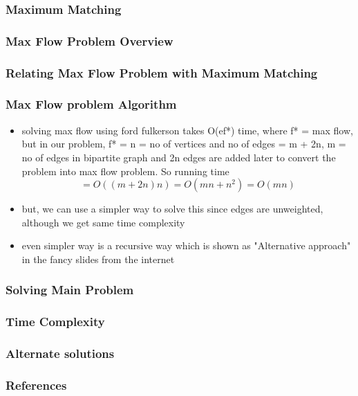 \documentclass[10pt]{beamer}
\begin{document}
\begin{frame}
	\frametitle{Maximum Matching}
\end{frame}

\begin{frame}
	\frametitle{Max Flow Problem Overview}
\end{frame}

\begin{frame}
	\frametitle{Relating Max Flow Problem with Maximum Matching}
\end{frame}


\begin{frame}
	\frametitle{Max Flow problem Algorithm}
	\begin{itemize}
		\item solving max flow using ford fulkerson takes O(ef*) time, where f* = max flow, but in our problem, f* = n = no of vertices
		and no of edges = m + 2n, m = no of edges in bipartite graph and 2n edges are added later to convert the problem into max flow problem. So running time$$ = O((m + 2n)n) = O(mn + n^2) = O(mn) $$
		
		
		\item but, we can use a simpler way to solve this since edges are unweighted, although we get same time complexity
		
		\item even simpler way is a recursive way which is shown as "Alternative approach" in the fancy slides from the internet

	\end{itemize}
	
		
\end{frame}



\begin{frame}
	\frametitle{Solving Main Problem}
\end{frame}

\begin{frame}
	\frametitle{Time Complexity}
\end{frame}

\begin{frame}
	\frametitle{Alternate solutions}
\end{frame}

\begin{frame}
	\frametitle{References}
\end{frame}
	
	
\end{document}
